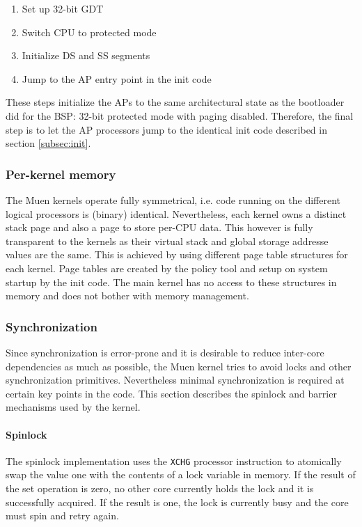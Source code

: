 \begin{enumerate}
	\item Set up 32-bit GDT
	\item Switch CPU to protected mode
	\item Initialize DS and SS segments
	\item Jump to the AP entry point in the init code
\end{enumerate}

These steps initialize the APs to the same architectural state as the
bootloader did for the BSP: 32-bit protected mode with paging disabled.
Therefore, the final step is to let the AP processors jump to the identical
init code described in section \ref{subsec:init}.

\subsubsection{Per-kernel memory}
The Muen kernels operate fully symmetrical, i.e. code running on the different
logical processors is (binary) identical. Nevertheless, each kernel owns a
distinct stack page and also a page to store per-CPU data. This however is fully
transparent to the kernels as their virtual stack and global storage addresse
values are the same. This is achieved by using different page table structures
for each kernel. Page tables are created by the policy tool and setup on system
startup by the init code. The main kernel has no access to these structures in
memory and does not bother with memory management.

\subsubsection{Synchronization} Since synchronization is error-prone and it is
desirable to reduce inter-core dependencies as much as possible, the Muen
kernel tries to avoid locks and other synchronization primitives. Nevertheless
minimal synchronization is required at certain key points in the code. This
section describes the spinlock and barrier mechanisms used by the kernel.

\paragraph{Spinlock}
The spinlock implementation uses the \texttt{XCHG} processor instruction to
atomically swap the value one with the contents of a lock variable in memory.
If the result of the set operation is zero, no other core currently holds the
lock and it is successfully acquired. If the result is one, the lock is
currently busy and the core must spin and retry again.

